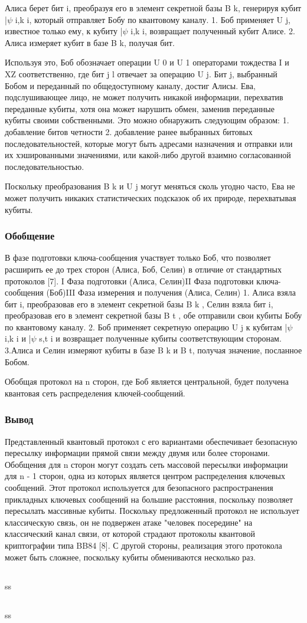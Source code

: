 Алиса берет бит i, преобразуя его в элемент секретной базы B k, генерируя кубит |$\psi$ i,k i, который отправляет Бобу по квантовому каналу.
1. Боб применяет U j, известное только ему, к кубиту |$\psi$ i,k i, возвращает полученный кубит Алисе.
2. Алиса измеряет кубит в базе B k, получая бит.

Используя это, Боб обозначает операции U 0 и U 1 операторами тождества I и XZ соответственно, где бит j l отвечает за операцию U j. Бит j, выбранный Бобом и переданный по общедоступному каналу, достиг Алисы. Ева, подслушивающее лицо, не может получить никакой информации, перехватив переданные кубиты, хотя она может нарушить обмен, заменив переданные кубиты своими собственными. Это можно обнаружить следующим образом:
1. добавление битов четности
2. добавление ранее выбранных битовых последовательностей, которые могут быть адресами назначения и отправки или их хэшированными значениями, или какой-либо другой взаимно согласованной последовательностью.

Поскольку преобразования B k и U j могут меняться сколь угодно часто, Ева не может получить никаких статистических подсказок об их природе, перехватывая кубиты.

\subsubsection{Обобщение}
В фазе подготовки ключа-сообщения участвует только Боб, что позволяет расширить ее до трех сторон (Алиса, Боб, Селин) в отличие от стандартных протоколов [7]. I Фаза подготовки (Алиса, Селин)II Фаза подготовки ключа-сообщения (Боб)III Фаза измерения и получения (Алиса, Селин)
1. Алиса взяла бит i, преобразовав его в элемент секретной базы B k , Селин взяла бит i, преобразовав его в элемент секретной базы B t , обе отправили свои кубиты Бобу по квантовому каналу.
2. Боб применяет секретную операцию U j к кубитам |$\psi$ i,k i и |$\psi$ s,t i и возвращает полученные кубиты соответствующим сторонам.
3.Алиса и Селин измеряют кубиты в базе B k и B t, получая значение, посланное Бобом.

Обобщая протокол на n сторон, где Боб является центральной, будет получена квантовая сеть распределения ключей-сообщений.

\subsubsection{Вывод}
Представленный квантовый протокол с его вариантами обеспечивает безопасную пересылку информации прямой связи между двумя или более сторонами. Обобщения для n сторон могут создать сеть массовой пересылки информации для n - 1 сторон, одна из которых является центром распределения ключевых сообщений. Этот протокол используется для безопасного распространения прикладных ключевых сообщений на большие расстояния, поскольку позволяет пересылать массивные кубиты. Поскольку предложенный протокол не использует классическую связь, он не подвержен атаке "человек посередине" на классический канал связи, от которой страдают протоколы квантовой криптографии типа BB84 [8]. С другой стороны, реализация этого протокола может быть сложнее, поскольку кубиты обмениваются несколько раз.

\subsection{\review}
ss
\subsection{\dic}
ss